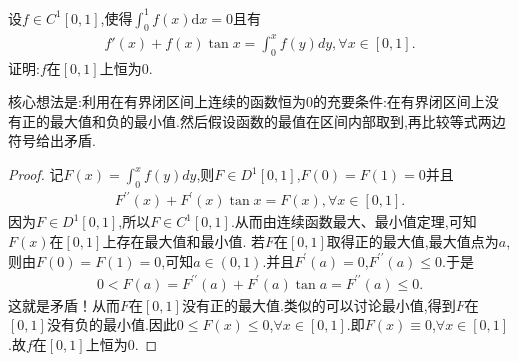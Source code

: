 \documentclass[../../main.tex]{subfiles}%
\begin{document}
\begin{example}
设$f\in C^1\left[ 0,1 \right] $,使得$\int_0^1{f\left( x \right) \mathrm{d}x}=0$且有
\begin{align*}
f'\left( x \right) +f\left( x \right) \tan x=\int_0^x{f\left( y \right) dy,\forall x\in \left[ 0,1 \right] .}
\end{align*}
证明:$f$在$[0,1]$上恒为$0$.
\end{example}
\begin{note}
核心想法是:利用在有界闭区间上连续的函数恒为$0$的充要条件:在有界闭区间上没有正的最大值和负的最小值.然后假设函数的最值在区间内部取到,再比较等式两边符号给出矛盾.
\end{note}
\begin{proof}
记\(F(x) = \int_{0}^{x}f(y)dy\),则\(F \in D^1[0,1]\),\(F(0) = F(1) = 0\)并且
\begin{align*}
F^{\prime\prime}(x) + F^{\prime}(x)\tan x = F(x),\forall x \in [0,1].
\end{align*}
因为\(F \in D^1[0,1]\),所以\(F \in C^1[0,1]\).从而由连续函数最大、最小值定理,可知\(F(x)\)在\([0,1]\)上存在最大值和最小值.
若\(F\)在\([0,1]\)取得正的最大值,最大值点为\(a\),则由\(F(0) = F(1) = 0\),可知\(a \in (0,1)\).并且\(F^{\prime}(a) = 0\),\(F^{\prime\prime}(a) \leqslant 0\).于是
\begin{align*}
0 < F(a) = F^{\prime\prime}(a) + F^{\prime}(a)\tan a = F^{\prime\prime}(a) \leqslant 0.
\end{align*}
这就是矛盾！从而\(F\)在\([0,1]\)没有正的最大值.类似的可以讨论最小值,得到\(F\)在\([0,1]\)没有负的最小值.因此\(0 \leqslant F(x) \leqslant 0\),\(\forall x \in [0,1]\).即\(F(x) \equiv 0\),\(\forall x \in [0,1]\).故\(f\)在\([0,1]\)上恒为\(0\). \end{proof}
\end{document}
